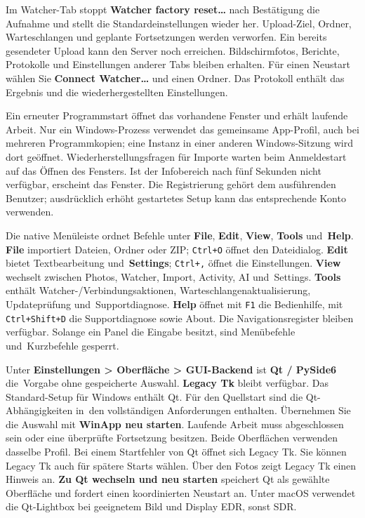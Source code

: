 \documentclass[11pt,a4paper]{article}
\newcommand{\ui}[1]{\textbf{#1}}
\begin{document}
Im Watcher-Tab stoppt \ui{Watcher factory reset…} nach Bestätigung die
Aufnahme und stellt die Standardeinstellungen wieder her. Upload-Ziel,
Ordner, Warteschlangen und geplante Fortsetzungen werden verworfen. Ein
bereits gesendeter Upload kann den Server noch erreichen. Bildschirmfotos,
Berichte, Protokolle und Einstellungen anderer Tabs bleiben erhalten.
Für einen Neustart wählen Sie \ui{Connect Watcher…} und einen Ordner.
Das Protokoll enthält das Ergebnis und die wiederhergestellten Einstellungen.

Ein erneuter Programmstart öffnet das vorhandene Fenster und erhält laufende
Arbeit. Nur ein Windows-Prozess verwendet das gemeinsame App-Profil, auch bei
mehreren Programmkopien; eine Instanz in einer anderen Windows-Sitzung wird dort
geöffnet. Wiederherstellungsfragen für Importe warten beim Anmeldestart auf das
Öffnen des Fensters. Ist der Infobereich nach fünf Sekunden nicht verfügbar,
erscheint das Fenster. Die Registrierung gehört dem ausführenden Benutzer;
ausdrücklich erhöht gestartetes Setup kann das entsprechende Konto verwenden.

Die native Menüleiste ordnet Befehle unter \ui{File}, \ui{Edit}, \ui{View},
\ui{Tools} und~\ui{Help}. \ui{File} importiert Dateien, Ordner oder ZIP;
\texttt{Ctrl+O} öffnet den Dateidialog. \ui{Edit} bietet Textbearbeitung
und~\ui{Settings}; \texttt{Ctrl+,} öffnet die Einstellungen. \ui{View}
wechselt zwischen Photos, Watcher, Import, Activity, AI und~Settings.
\ui{Tools} enthält Watcher-/Verbindungsaktionen, Warteschlangenaktualisierung,
Updateprüfung und~Supportdiagnose. \ui{Help} öffnet mit \texttt{F1} die
Bedienhilfe, mit \texttt{Ctrl+Shift+D} die Supportdiagnose sowie About.
Die Navigationsregister bleiben verfügbar. Solange ein Panel die Eingabe
besitzt, sind Menübefehle und~Kurzbefehle gesperrt.

Unter \ui{Einstellungen > Oberfläche > GUI-Backend} ist \ui{Qt / PySide6}
die~Vorgabe ohne gespeicherte Auswahl. \ui{Legacy Tk} bleibt verfügbar.
Das Standard-Setup für Windows enthält Qt. Für den Quellstart sind die
Qt-Abhängigkeiten in~den vollständigen Anforderungen enthalten.
Übernehmen Sie die Auswahl mit \ui{WinApp neu starten}. Laufende Arbeit muss
abgeschlossen sein oder eine überprüfte Fortsetzung besitzen. Beide
Oberflächen verwenden dasselbe Profil. Bei einem Startfehler von Qt öffnet
sich Legacy Tk. Sie können Legacy Tk auch für spätere Starts wählen.
Über den Fotos zeigt Legacy Tk einen Hinweis an.
\ui{Zu Qt wechseln und neu starten} speichert Qt als gewählte Oberfläche
und fordert einen koordinierten Neustart an. Unter macOS
verwendet die Qt-Lightbox bei geeignetem Bild und Display EDR, sonst SDR.
\end{document}
